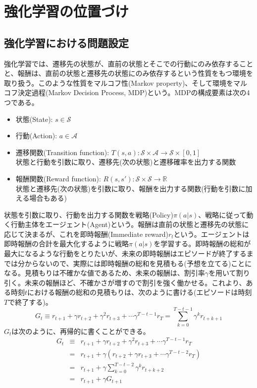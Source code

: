 \documentclass[dvipdfmx]{jsarticle}
\begin{document}
\section{強化学習の位置づけ}

\subsection{強化学習における問題設定}
強化学習では、遷移先の状態が、直前の状態とそこでの行動にのみ依存することと、報酬は、直前の状態と遷移先の状態にのみ依存するという性質をもつ環境を取り扱う。このような性質をマルコフ性(Markov property)、そして環境をマルコフ決定過程(Markov Decision Process, MDP)という。MDPの構成要素は次の4つである。
\begin{itemize}
	\item 状態(State): $s \in \mathcal{S}$
	\item 行動(Action): $a \in \mathcal{A}$
	\item 遷移関数(Transition function): $T(s, a): \mathcal{S} \times \mathcal{A} \to \mathcal{S} \times \left[ 0, 1 \right]$ \\
	状態と行動を引数に取り、遷移先(次の状態)と遷移確率を出力する関数
	\item 報酬関数(Reward function): $R(s, s'): \mathcal{S} \times \mathcal{S} \to \mathbb{R}$ \\
	状態と遷移先(次の状態)を引数に取り、報酬を出力する関数(行動を引数に加える場合もある)
\end{itemize}
状態を引数に取り、行動を出力する関数を戦略(Policy)$\pi(a | s)$、戦略に従って動く行動主体をエージェント(Agent)という。報酬は直前の状態と遷移先の状態に応じて決まるが、これを即時報酬(Immediate reward)$r_t$という。エージェントは即時報酬の合計を最大化するように戦略$\pi(a | s)$を学習する。即時報酬の総和が最大になるような行動をとりたいが、未来の即時報酬はエピソードが終了するまでは分からないので、実際には即時報酬の総和を見積もる(予想を立てる)ことになる。見積もりは不確かな値であるため、未来の報酬は、割引率$\gamma$を用いて割り引く。未来の報酬ほど、不確かさが増すので割引を強く働かせる。これより、ある時刻$t$における報酬の総和の見積もりは、次のように書ける(エピソードは時刻$T$で終了する)。
\begin{equation}
	G_t \equiv r_{t + 1} + \gamma r_{t + 2} + \gamma^2 r_{t + 3} + \cdots \gamma^{T - t - 1} r_T = \sum_{k = 0}^{T - t - 1} \gamma^k r_{t + k + 1}
\end{equation}
$G_t$は次のように、再帰的に書くことができる。
\begin{eqnarray}
	G_t &\equiv& r_{t + 1} + \gamma r_{t + 2} + \gamma^2 r_{t + 3} + \cdots \gamma^{T - t - 1} r_T \\
	&=& r_{t + 1} + \gamma \left( r_{t + 2} + \gamma r_{t + 3} + \cdots \gamma^{T - t - 2} r_T \right) \\
	&=& r_{t + 1} + \gamma \sum_{k = 0}^{T - t - 2} \gamma^k r_{t + k + 2} \\
	&=& r_{t + 1} + \gamma G_{t + 1}
\end{eqnarray}
\end{document}

